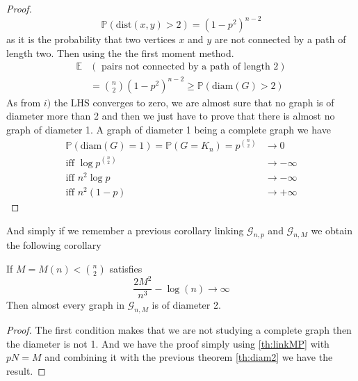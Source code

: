 \begin{proof}
	\begin{equation}
		\mathbb{P}(\text{dist}(x, y) > 2) = (1-p^2)^{n-2}
	\end{equation}
	as it is the probability that two vertices $x$ and $y$ are not connected by a path of length two.
	\newline
	Then using the the first moment method.
	\begin{align}
		\mathbb{E}&(\text{ pairs not connected by a path of length 2})	\\
				&= \binom{n}{2}(1-p^2)^{n-2} \geq \mathbb{P}(\text{diam}(G) > 2)
	\end{align}
	As from $i)$ the LHS converges to zero, we are almost sure that no graph is of diameter more than 2 and then we just have to prove that there is almost no graph of diameter 1.
	A graph of diameter 1 being a complete graph we have
	\begin{align}
		\mathbb{P}(\text{diam}(G) = 1) = \mathbb{P}(G = K_n) 	
				= p^{\binom{n}{2}} &\longrightarrow 0				\\
		\text{iff  } \log p^{\binom{n}{2}} &\longrightarrow -\infty			\\
			   \text{iff  } n^2 \log p &\longrightarrow -\infty			\\
			    \text{iff  } n^2 (1-p) &\longrightarrow +\infty			
	\end{align}	
\end{proof}
And simply if we remember a previous corollary linking $\mathcal{G}_{n,p}$ and $\mathcal{G}_{n,M}$ we obtain the following corollary

\begin{corollary}
	If $M=M(n) < \binom{n}{2}$ satisfies 
	\begin{equation}
		\frac{2M^2}{n^3} - \log(n) \longrightarrow \infty
	\end{equation}
	Then almost every graph in $\mathcal{G}_{n, M}$ is of diameter 2.
\end{corollary}
\begin{proof}
	The first condition makes that we are not studying a complete graph then the diameter is not 1.
	And we have the proof simply using \ref{th:linkMP} with $pN = M$ and combining it with the previous theorem \ref{th:diam2} we have the result.
\end{proof}

